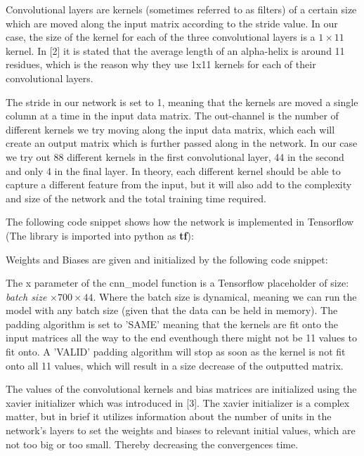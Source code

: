 \documentclass{article}
\begin{document}
Convolutional layers are kernels (sometimes referred to as filters) of a certain size which are moved along the input matrix according to the stride value. In our case, the size of the kernel for each of the three convolutional layers is a $1\times11$ kernel. In  [2] it is stated that the average length of an alpha-helix is around 11 residues, which is the reason why they use 1x11 kernels for each of their convolutional layers. 

The stride in our network is set to 1, meaning that the kernels are moved a single column at a time in the input data matrix. The out-channel is the number of different kernels we try moving along the input data matrix, which each will create an output matrix which is further passed along in the network. In our case we try out 88 different kernels in the first convolutional layer, 44 in the second and only 4 in the final layer. In theory, each different kernel should be able to capture a different feature from the input, but it will also add to the complexity and size of the network and the total training time required. 

The following code snippet shows how the network is implemented in Tensorflow (The library is imported into python as \textbf{tf}):



Weights and Biases are given and initialized by the following code snippet:



The x parameter of the cnn\_model function is a Tensorflow placeholder of size: \textit{batch size} $\times700\times44$. Where the batch size is dynamical, meaning we can run the model with any batch size (given that the data can be held in memory). The padding algorithm is set to 'SAME' meaning that the kernels are fit onto the input matrices all the way to the end eventhough there might not be 11 values to fit onto. A 'VALID' padding algorithm will stop as soon as the kernel is not fit onto all 11 values, which will result in a size decrease of the outputted matrix. 

The values of the convolutional kernels and bias matrices are initialized using the xavier initializer which was introduced in [3]. The xavier initializer is a complex matter, but in brief it utilizes information about the number of units in the network's layers to set the weights and biases to relevant initial values, which are not too big or too small. Thereby decreasing the convergences time.
\end{document}
